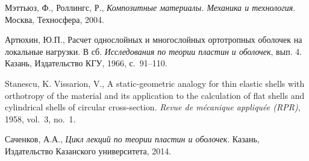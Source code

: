 \documentclass[press]{vestnik}
\begin{document}
\begin{thebibliography}{21}
Мэттьюз, Ф., Роллингс, Р., \textit{Композитные материалы. Механика и технология}. Москва, Техносфера, 2004. 

Артюхин, Ю.П., Расчет однослойных и многослойных ортотропных оболочек на локальные нагрузки. В сб. \textit{Исследования по теории пластин и оболочек}, вып. 4. Казань, Издательство КГУ, 1966, с.~91--110. 

Stanescu, K. Vissarion, V., A static-geometric analogy for thin elastic shells with orthotropy of the material and its application to the calculation of flat shells and cylindrical shells of circular cross-section. \textit{Revue de mécanique appliquée (RPR)}, 1958, vol.~3, no.~1.

Саченков, А.А., \textit{Цикл лекций по теории пластин и оболочек}. Казань, Издательство Казанского университета, 2014. 
\end{thebibliography}
\end{document}
